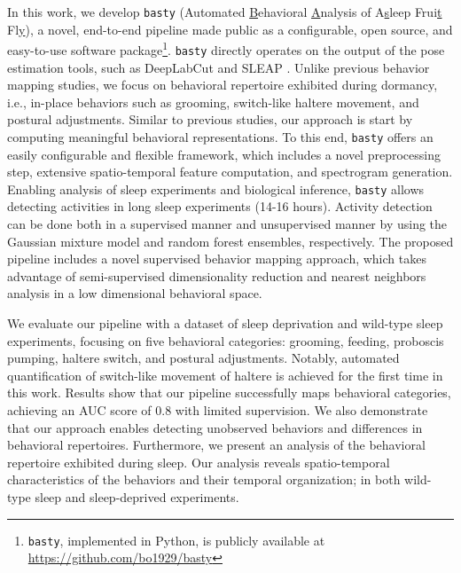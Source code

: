 In this work, we develop \texttt{basty} (Automated \underline{B}ehavioral \underline{A}nalysis of A\underline{s}leep Frui\underline{t} Fl\underline{y}), a novel, end-to-end pipeline made public as a configurable, open source, and easy-to-use software package\footnote{\texttt{basty}, implemented in Python, is publicly available at \url{https://github.com/bo1929/basty}}.
\texttt{basty} directly operates on the output of the pose estimation tools, such as DeepLabCut \citep{mathis_deeplabcut_2018} and SLEAP \cite{pereira_sleap_2022}.
Unlike previous behavior mapping studies, we focus on behavioral repertoire exhibited during dormancy, i.e., in-place behaviors such as grooming, switch-like haltere movement, and postural adjustments.
Similar to previous studies, our approach is start by computing meaningful behavioral representations.
To this end, \texttt{basty} offers an easily configurable and flexible framework, which includes a novel preprocessing step, extensive spatio-temporal feature computation, and spectrogram generation.
Enabling analysis of sleep experiments and biological inference, \texttt{basty} allows detecting activities in long sleep experiments (14-16 hours).
Activity detection can be done both in a supervised manner and unsupervised manner by using the Gaussian mixture model and random forest ensembles, respectively.
The proposed pipeline includes a novel supervised behavior mapping approach, which takes advantage of semi-supervised dimensionality reduction and nearest neighbors analysis in a low dimensional behavioral space.

We evaluate our pipeline with a dataset of sleep deprivation and wild-type sleep experiments, focusing on five behavioral categories: grooming, feeding, proboscis pumping, haltere switch, and postural adjustments.
Notably, automated quantification of switch-like movement of haltere is achieved for the first time in this work.
Results show that our pipeline successfully maps behavioral categories, achieving an AUC score of 0.8 with limited supervision.
We also demonstrate that our approach enables detecting unobserved behaviors and differences in behavioral repertoires.
Furthermore, we present an analysis of the behavioral repertoire exhibited during sleep.
Our analysis reveals spatio-temporal characteristics of the behaviors and their temporal organization; in both wild-type sleep and sleep-deprived experiments.

